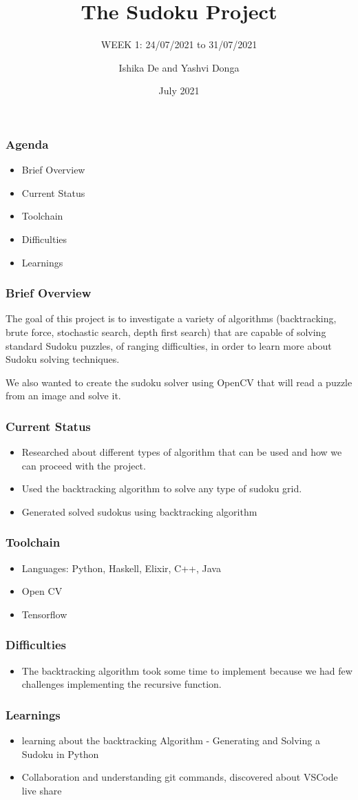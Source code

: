 \documentclass{beamer}
\title{The Sudoku Project}
\subtitle{WEEK 1: 24/07/2021 to 31/07/2021}
\author[Ishika | Yashvi]{Ishika De and Yashvi Donga}
\date{July 2021}
\begin{document}
\begin{frame}
     \titlepage
\end{frame}
\begin{frame}
     \frametitle{Agenda}
     \begin{itemize}
          \item Brief Overview
          \item Current Status
          \item Toolchain
          \item Difficulties
          \item Learnings
     \end{itemize}
\end{frame}

\begin{frame}
     \frametitle{Brief Overview}
     The goal of this project is to investigate a variety of algorithms (backtracking, brute force, stochastic search, depth first search) that are capable of solving
standard Sudoku puzzles, of ranging difficulties, in order to learn more about Sudoku
solving techniques.\newline

     We also wanted to create the sudoku solver using OpenCV that will read a puzzle from an image and solve it.
\end{frame}
\begin{frame}
     \frametitle{Current Status}   
     \begin{itemize}
          \item Researched about different types of algorithm that can be used and how we can proceed with the project.
          \item Used the backtracking algorithm to solve any type of sudoku grid.
          \item Generated solved sudokus using backtracking algorithm
     \end{itemize}
\end{frame}


\begin{frame}
     \frametitle{Toolchain}
     \begin{itemize}
          \item Languages: Python, Haskell, Elixir, C++, Java
          \item Open CV
          \item Tensorflow
     \end{itemize}
\end{frame}

\begin{frame}
     \frametitle{Difficulties}
     \begin{itemize}
          \item The backtracking algorithm took some time to implement because we had few challenges implementing the recursive function.
\end{itemize}
\end{frame}

\begin{frame}
     \frametitle{Learnings}
     \begin{itemize}
     \item learning about the backtracking Algorithm -  Generating and Solving a Sudoku in Python
     \item Collaboration and understanding git commands, discovered about VSCode live share
\end{itemize}         
\end{frame}
\end{document}
